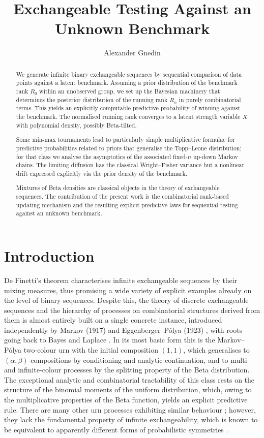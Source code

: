 \documentclass[11pt,reqno]{amsart}
\title[ Exchangeable Testing Against an Unknown Benchmark]
{Exchangeable Testing Against an Unknown Benchmark}
\author{Alexander Gnedin}
\theoremstyle{definition}
\theoremstyle{remark}
\numberwithin{equation}{section}
\begin{document}
\begin{abstract}
We generate infinite binary exchangeable sequences by sequential comparison of data points against a latent benchmark. Assuming a prior distribution of the benchmark rank \(R_0\) within an unobserved group, we set up the Bayesian machinery that determines the posterior distribution of the running rank \(R_n\) in purely combinatorial terms. This yields an explicitly computable predictive probability of winning against the benchmark. The normalised running rank converges to a latent strength variable \(X\) with polynomial density, possibly Beta-tilted.

Some min-max tournaments lead to particularly simple multiplicative formulae for predictive probabilities related to priors that generalise the Topp--Leone distribution; for that class we analyse the asymptotics of the associated fixed-\(n\) up-down Markov chains. The limiting diffusion has the classical Wright--Fisher variance but a nonlinear drift expressed explicitly via the prior density of the benchmark.

Mixtures of Beta densities are classical objects in the theory of exchangeable sequences. The contribution of the present work is the combinatorial rank-based updating mechanism and the resulting explicit predictive laws for sequential testing against an unknown benchmark.
\end{abstract}

\maketitle

\section{Introduction}

De Finetti's theorem characterises infinite exchangeable sequences by their mixing measures, thus promising a wide variety of explicit examples already on the level of binary sequences. Despite this, the theory of discrete exchangeable sequences and the hierarchy of processes on combinatorial structures derived from them \cite{Pitman2006,Bertoin2006} is almost entirely built on a single concrete instance, introduced independently by Markov (1917) and Eggenberger--P\'olya (1923) \cite{JohnsonKotz1977}, with roots going back to Bayes and Laplace \cite{Zabell2005}. In its most basic form this is the Markov--P\'olya two-colour urn with the initial composition \((1,1)\), which generalises to \((\alpha,\beta)\)-compositions by conditioning and analytic continuation, and to multi- and infinite-colour processes by the splitting property of the Beta distribution. The exceptional analytic and combinatorial tractability of this class rests on the structure of the binomial moments of the uniform distribution, which, owing to the multiplicative properties of the Beta function, yields an explicit predictive rule. There are many other urn processes exhibiting similar behaviour \cite{FlajoletDumasPuyhaubert2006,Janson2006}; however, they lack the fundamental property of infinite exchangeability, which is known to be equivalent to apparently different forms of probabilistic symmetries \cite{Kallenberg2005,PitmanYor1997,Gnedin2026sym}.
\end{document}
